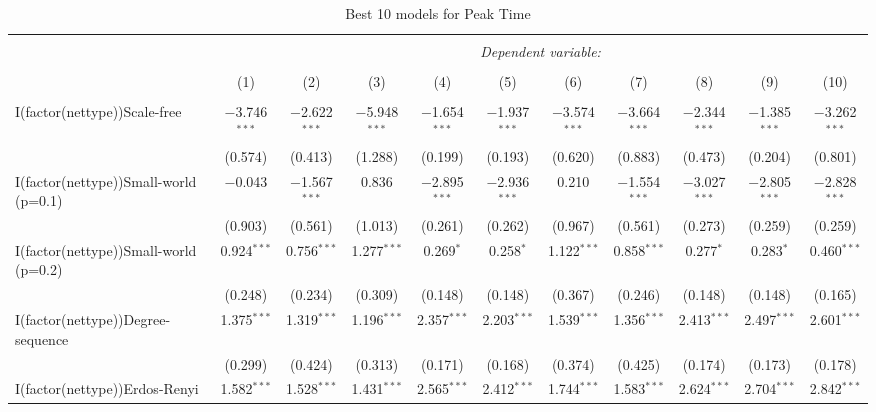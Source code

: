 
\begin{table}[!htbp] \centering 
  \caption{Best 10 models for Peak Time} 
  \label{tab:best_models_peak_time} 
\begin{tabular}{@{\extracolsep{5pt}}lcccccccccc} 
\\[-1.8ex]\hline 
\hline \\[-1.8ex] 
 & \multicolumn{10}{c}{\textit{Dependent variable:}} \\ 
\cline{2-11} 
\\[-1.8ex] & (1) & (2) & (3) & (4) & (5) & (6) & (7) & (8) & (9) & (10)\\ 
\hline \\[-1.8ex] 
 I(factor(nettype))Scale-free & $-$3.746$^{***}$ & $-$2.622$^{***}$ & $-$5.948$^{***}$ & $-$1.654$^{***}$ & $-$1.937$^{***}$ & $-$3.574$^{***}$ & $-$3.664$^{***}$ & $-$2.344$^{***}$ & $-$1.385$^{***}$ & $-$3.262$^{***}$ \\ 
  & (0.574) & (0.413) & (1.288) & (0.199) & (0.193) & (0.620) & (0.883) & (0.473) & (0.204) & (0.801) \\ 
  I(factor(nettype))Small-world (p=0.1) & $-$0.043 & $-$1.567$^{***}$ & 0.836 & $-$2.895$^{***}$ & $-$2.936$^{***}$ & 0.210 & $-$1.554$^{***}$ & $-$3.027$^{***}$ & $-$2.805$^{***}$ & $-$2.828$^{***}$ \\ 
  & (0.903) & (0.561) & (1.013) & (0.261) & (0.262) & (0.967) & (0.561) & (0.273) & (0.259) & (0.259) \\ 
  I(factor(nettype))Small-world (p=0.2) & 0.924$^{***}$ & 0.756$^{***}$ & 1.277$^{***}$ & 0.269$^{*}$ & 0.258$^{*}$ & 1.122$^{***}$ & 0.858$^{***}$ & 0.277$^{*}$ & 0.283$^{*}$ & 0.460$^{***}$ \\ 
  & (0.248) & (0.234) & (0.309) & (0.148) & (0.148) & (0.367) & (0.246) & (0.148) & (0.148) & (0.165) \\ 
  I(factor(nettype))Degree-sequence & 1.375$^{***}$ & 1.319$^{***}$ & 1.196$^{***}$ & 2.357$^{***}$ & 2.203$^{***}$ & 1.539$^{***}$ & 1.356$^{***}$ & 2.413$^{***}$ & 2.497$^{***}$ & 2.601$^{***}$ \\ 
  & (0.299) & (0.424) & (0.313) & (0.171) & (0.168) & (0.374) & (0.425) & (0.174) & (0.173) & (0.178) \\ 
  I(factor(nettype))Erdos-Renyi & 1.582$^{***}$ & 1.528$^{***}$ & 1.431$^{***}$ & 2.565$^{***}$ & 2.412$^{***}$ & 1.744$^{***}$ & 1.583$^{***}$ & 2.624$^{***}$ & 2.704$^{***}$ & 2.842$^{***}$ \\ 

\end{tabular}
\end{table}
